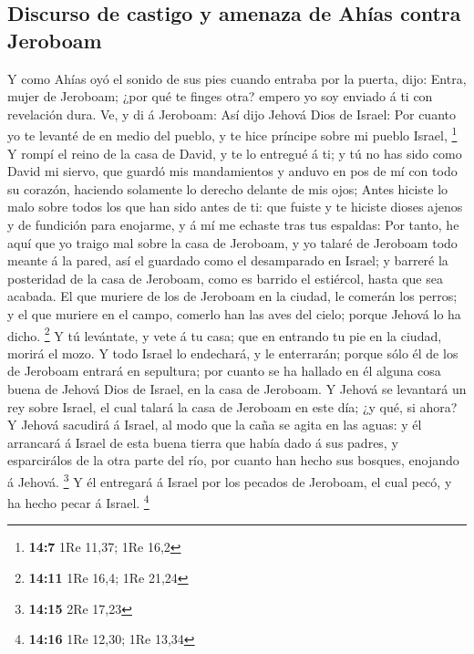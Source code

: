 \hypertarget{discurso-de-castigo-y-amenaza-de-ahuxedas-contra-jeroboam}{%
\subsection{Discurso de castigo y amenaza de Ahías contra
Jeroboam}\label{discurso-de-castigo-y-amenaza-de-ahuxedas-contra-jeroboam}}

 Y como Ahías oyó el sonido de sus pies cuando entraba por
la puerta, dijo: Entra, mujer de Jeroboam; ¿por qué te finges otra?
empero yo soy enviado á ti con revelación dura.  Ve, y di
á Jeroboam: Así dijo Jehová Dios de Israel: Por cuanto yo te levanté de
en medio del pueblo, y te hice príncipe sobre mi pueblo Israel,
\footnote{\textbf{14:7} 1Re 11,37; 1Re 16,2}  Y rompí el
reino de la casa de David, y te lo entregué á ti; y tú no has sido como
David mi siervo, que guardó mis mandamientos y anduvo en pos de mí con
todo su corazón, haciendo solamente lo derecho delante de mis ojos;
 Antes hiciste lo malo sobre todos los que han sido antes
de ti: que fuiste y te hiciste dioses ajenos y de fundición para
enojarme, y á mí me echaste tras tus espaldas:  Por
tanto, he aquí que yo traigo mal sobre la casa de Jeroboam, y yo talaré
de Jeroboam todo meante á la pared, así el guardado como el desamparado
en Israel; y barreré la posteridad de la casa de Jeroboam, como es
barrido el estiércol, hasta que sea acabada.  El que
muriere de los de Jeroboam en la ciudad, le comerán los perros; y el que
muriere en el campo, comerlo han las aves del cielo; porque Jehová lo ha
dicho. \footnote{\textbf{14:11} 1Re 16,4; 1Re 21,24}  Y
tú levántate, y vete á tu casa; que en entrando tu pie en la ciudad,
morirá el mozo.  Y todo Israel lo endechará, y le
enterrarán; porque sólo él de los de Jeroboam entrará en sepultura; por
cuanto se ha hallado en él alguna cosa buena de Jehová Dios de Israel,
en la casa de Jeroboam.  Y Jehová se levantará un rey
sobre Israel, el cual talará la casa de Jeroboam en este día; ¿y qué, si
ahora?  Y Jehová sacudirá á Israel, al modo que la caña
se agita en las aguas: y él arrancará á Israel de esta buena tierra que
había dado á sus padres, y esparcirálos de la otra parte del río, por
cuanto han hecho sus bosques, enojando á Jehová. \footnote{\textbf{14:15}
  2Re 17,23}  Y él entregará á Israel por los pecados de
Jeroboam, el cual pecó, y ha hecho pecar á Israel. \footnote{\textbf{14:16}
  1Re 12,30; 1Re 13,34}

